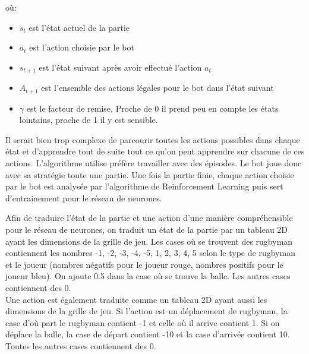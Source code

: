 \documentclass[a4paper,12pt]{article}
\begin{document}
où:
\begin{itemize}
    \item $s_{t}$ est l'état actuel de la partie
    \item $a_{t}$ est l'action choisie par le bot
    \item $s_{t+1}$ est l'état suivant après avoir effectué l'action $a_{t}$
    \item $A_{t+1}$ est l'ensemble des actions légales pour le bot dans l'état suivant
    \item $\gamma$ est le facteur de remise. Proche de 0 il prend peu en compte les états lointains, proche de 1 il y est sensible.
\end{itemize}
Il serait bien trop complexe de parcourir toutes les actions possibles dans chaque état et d'apprendre tout de suite tout ce qu'on peut apprendre sur chacune de ces actions. L'algorithme utilise préfère travailler avec des épisodes. Le bot joue donc avec sa stratégie toute une partie. Une fois la partie finie, chaque action choisie par le bot est analysée par l'algorithme de Reinforcement Learning puis sert d'entrainement pour le réseau de neurones.

Afin de traduire l'état de la partie et une action d'une manière compréhensible pour le réseau de neurones, on traduit un état de la partie par un tableau 2D ayant les dimensions de la grille de jeu. Les cases où se trouvent des rugbyman contiennent les nombres -1, -2, -3, -4, -5, 1, 2, 3, 4, 5 selon le type de rugbyman et le joueur (nombres négatifs pour le joueur rouge, nombres positifs pour le joueur bleu). On ajoute 0.5 dans la case où se trouve la balle. Les autres cases contiennent des 0.\\
Une action est également traduite comme un tableau 2D ayant aussi les dimensions de la grille de jeu. Si l'action est un déplacement de rugbyman, la case d'où part le rugbyman contient -1 et celle où il arrive contient 1. Si on déplace la balle, la case de départ contient -10 et la case d'arrivée contient 10. Toutes les autres cases contiennent des 0.\\
\end{document}
